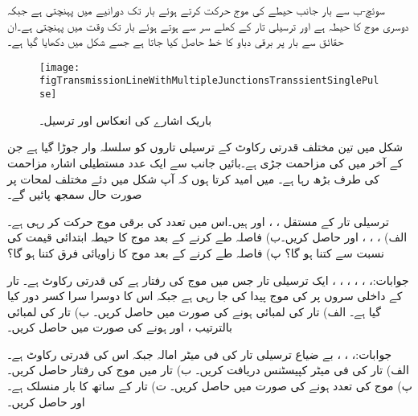 سوئچ-ب سے بار جانب  حیطے کی موج حرکت کرتے ہوئے بار تک  دورانیے میں پہنچتی ہے جبکہ دوسری موج کا حیطہ  ہے اور ترسیلی تار کے کھلے سر سے ہوتے ہوئے بار تک  وقت میں پہنچتی ہے۔ان حقائق سے بار پر برقی دباو کا خط حاصل کیا جاتا ہے جسے شکل  میں دکھایا گیا ہے۔

\begin{figure}
\centering
\texttt{[image: figTransmissionLineWithMultipleJunctionsTranssientSinglePulse]}
\caption{باریک اشارے کی انعکاس اور ترسیل۔}
\label{شکل_ترسیلی_تار_باریک_اشارے_کی_انعکاس}
\end{figure}

شکل  میں تین مختلف قدرتی رکاوٹ کے ترسیلی تاروں کو سلسلہ وار جوڑا گیا ہے جن کے آخر میں  کی مزاحمت جڑی ہے۔بائیں جانب سے ایک عدد مستطیلی اشارہ مزاحمت کی طرف بڑھ رہا ہے۔ میں امید کرتا ہوں کہ آپ شکل میں دئے مختلف لمحات پر صورت حال سمجھ پائیں گے۔
\newpage
{}

ترسیلی تار کے مستقل ، ،  اور  ہیں۔اس میں  تعدد کی برقی موج حرکت کر رہی ہے۔ الف) ، ، ،  اور  حاصل کریں۔ب)   فاصلہ طے کرنے کے بعد موج کا حیطہ ابتدائی قیمت کی نسبت سے کتنا ہو گا؟ پ)  فاصلہ طے کرنے کے بعد موج کا زاویائی فرق کتنا ہو گا؟ 

جوابات:، ، ، ، ، ، 
ایک ترسیلی تار جس میں موج کی رفتار  ہے کی قدرتی رکاوٹ  ہے۔ تار کے داخلی سروں پر  کی موج پیدا کی جا رہی ہے جبکہ اس کا دوسرا سرا کسر دور کیا گیا ہے۔ الف) تار کی لمبائی  ہونے کی صورت میں  حاصل کریں۔ ب) تار کی لمبائی بالترتیب ،  اور  ہونے کی صورت میں  حاصل کریں۔

جوابات:، ، ،  
بے ضیاع ترسیلی تار کی فی میٹر امالہ  جبکہ اس کی قدرتی رکاوٹ  ہے۔الف) تار کی فی میٹر کپیسٹنس دریافت کریں۔ ب) تار میں موج کی رفتار حاصل کریں۔ پ) موج کی تعدد  ہونے کی صورت میں  حاصل کریں۔ ت) تار کے ساتھ  کا بار منسلک ہے۔  اور  حاصل کریں۔

